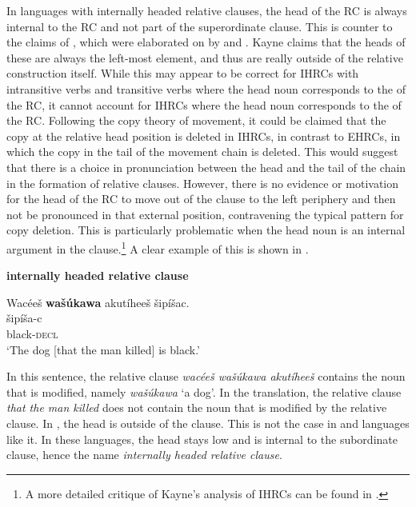 \documentclass[output=paper]{LSP/langsci}
\begin{document}
In languages with internally headed relative clauses, the head of the RC is always internal to the RC and not part of the superordinate clause. This is counter to the claims of \citet{Kayne1994}, which were elaborated on by \citet{Bianchi1999} and \citet{DiSciullo2005}. Kayne claims that the heads of these  are always the left-most element, and thus are really outside of the relative construction itself.  While this may appear to be correct for IHRCs with intransitive verbs and transitive verbs where the head noun corresponds to the  of the RC, it cannot account for IHRCs where the head noun corresponds to the  of the RC. Following the copy theory of movement, it could be claimed that the copy at the relative head position is deleted in IHRCs, in contrast to EHRCs, in which the copy in the tail of the movement chain is deleted. This would suggest that there is a choice in pronunciation between the head and the tail of the chain in the formation of relative clauses. However, there is no evidence or motivation for the head of the RC to move out of the clause to the left periphery and then not be pronounced in that external position, contravening the typical pattern for copy deletion. This is particularly problematic when the head noun is an internal argument in the clause.\footnote{A more detailed critique of Kayne's analysis of IHRCs can be found in \citet{Boyle2007}.}  A clear example of this is shown in .

\ea \textbf{ internally headed relative clause} \label{boyle11}

\glll {\ob}Wacée\v{s} \textbf{wa\v{s}\'ukawa} akut\'ihee\v{s}{\cb} \v{s}ip\'i\v{s}ac.\\
[wacée-\v{s}    \textbf{wa\v{s}\'uka-wa}  aku-t\'i-hee-\v{s}]  \v{s}ip\'i\v{s}a-c\\
[man-\textsc{det.d} \textbf{dog-\textsc{det.i}}  \textsc{rel.s}-die-\textsc{3.caus.d.sg}-\textsc{det.d}] black-\textsc{decl}\\
\trans `The dog [that the man killed] is black.' 
\z

\newpage
In this sentence, the relative clause \textit{wacée\v{s} wa\v{s}\'ukawa akut\'ihee\v{s}} contains the noun that is modified, namely \textit{wa\v{s}\'ukawa} `a dog'. In the  translation, the relative clause \textit{that the man killed} does not contain the noun that is modified by the relative clause. In , the head is outside of the clause. This is not the case in  and languages like it.  In these languages, the head stays low and is internal to the subordinate clause, hence the name \textit{internally headed relative clause}.
	
\end{document}
